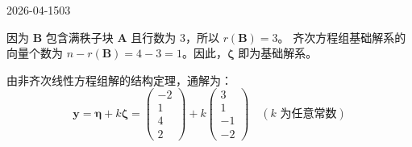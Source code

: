\begin{mistake}{2026-04-15}{03}
\begin{solutioncontent}
因为 \(\boldsymbol{B}\) 包含满秩子块 \(\boldsymbol{A}\) 且行数为 3，所以 \(r(\boldsymbol{B}) = 3\)。
齐次方程组基础解系的向量个数为 \(n - r(\boldsymbol{B}) = 4 - 3 = 1\)。因此，\(\boldsymbol{\zeta}\) 即为基础解系。

由非齐次线性方程组解的结构定理，通解为：
\[ \boldsymbol{y} = \boldsymbol{\eta} + k\boldsymbol{\zeta} = \begin{pmatrix} -2 \\ 1 \\ 4 \\ 2 \end{pmatrix} + k \begin{pmatrix} 3 \\ 1 \\ -1 \\ -2 \end{pmatrix} \quad (k \text{ 为任意常数}) \]
\end{solutioncontent}


\end{mistake}
